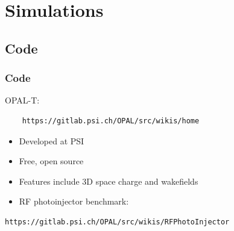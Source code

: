 \documentclass[professionalfonts,t]{beamer}
\begin{document}
\section{Simulations}
\subsection{Code}
\begin{frame}[containsverbatim]
\frametitle{Code}
OPAL-T: \begin{verbatim}
	https://gitlab.psi.ch/OPAL/src/wikis/home
\end{verbatim}
\begin{itemize}
\item Developed at PSI
\item Free, open source 
\item Features include 3D space charge and wakefields
\item RF photoinjector benchmark:
\end{itemize}
\begin{verbatim}
https://gitlab.psi.ch/OPAL/src/wikis/RFPhotoInjector
\end{verbatim}
\end{frame}
\end{document}
